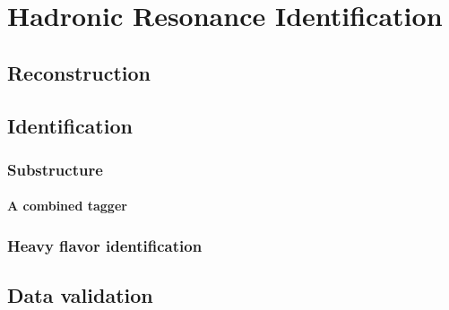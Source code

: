 \chapter{Hadronic Resonance Identification}

\section{Reconstruction}

\section{Identification}

\subsection{Substructure}

\subsubsection{A combined tagger}
\label{sec:jets:combined}

\subsection{Heavy flavor identification}

\section{Data validation}
